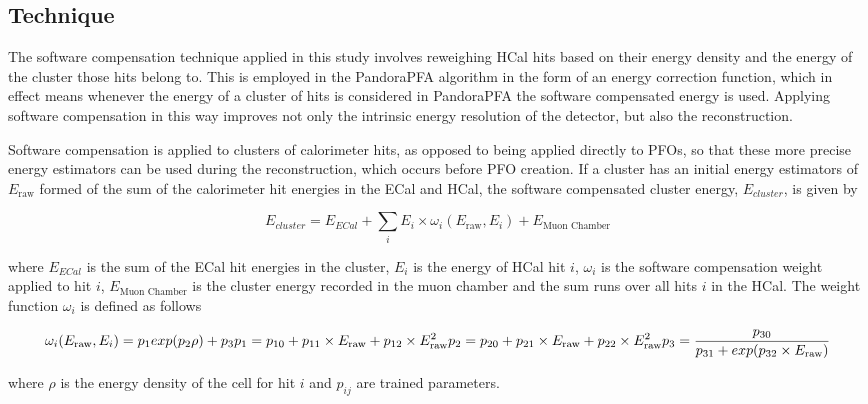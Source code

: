 \subsection{Technique}
The software compensation technique applied in this study involves reweighing HCal hits based on their energy density and the energy of the cluster those hits belong to.  This is employed in the PandoraPFA algorithm in the form of an energy correction function, which in effect means whenever the energy of a cluster of hits is considered in PandoraPFA the software compensated energy is used.  Applying software compensation in this way improves not only the intrinsic energy resolution of the detector, but also the reconstruction.  

Software compensation is applied to clusters of calorimeter hits, as opposed to being applied directly to PFOs, so that these more precise energy estimators can be used during the reconstruction, which occurs before PFO creation.  If a cluster has an initial energy estimators of $E_{\text{raw}}$ formed of the sum of the calorimeter hit energies in the ECal and HCal, the software compensated cluster energy, $E_{cluster}$, is given by 

\begin{equation}
E_{cluster} = E_{ECal} + \sum_{i} E_{i} \times \omega_{i}(E_{\text{raw}}, E_{i}) + E_{\text{Muon Chamber}}
\label{equ:softcomp}
\end{equation}

where $E_{ECal}$ is the sum of the ECal hit energies in the cluster, $E_{i}$ is the energy of HCal hit $i$, $\omega_{i}$ is the software compensation weight applied to hit $i$, $E_{\text{Muon Chamber}}$ is the cluster energy recorded in the muon chamber and the sum runs over all hits $i$ in the HCal.  The weight function $\omega_{i}$ is defined as follows

\begin{equation}
\omega_{i}(E_{\text{raw}}, E_{i}) = p_{1}exp(p_{2}\rho) + p_{3} \\
p_{1} = p_{10} + p_{11} \times E_{\text{raw}} + p_{12} \times E_{\text{raw}}^{2} \\
p_{2} = p_{20} + p_{21} \times E_{\text{raw}} + p_{22} \times E_{\text{raw}}^{2} \\
p_{3} = \frac{p_{30}}{p_{31} + exp(p_{32} \times E_{\text{raw}})}
\label{equ:softcompweight}
\end{equation}

where $\rho$ is the energy density of the cell for hit $i$ and $p_{ij}$ are trained parameters.

